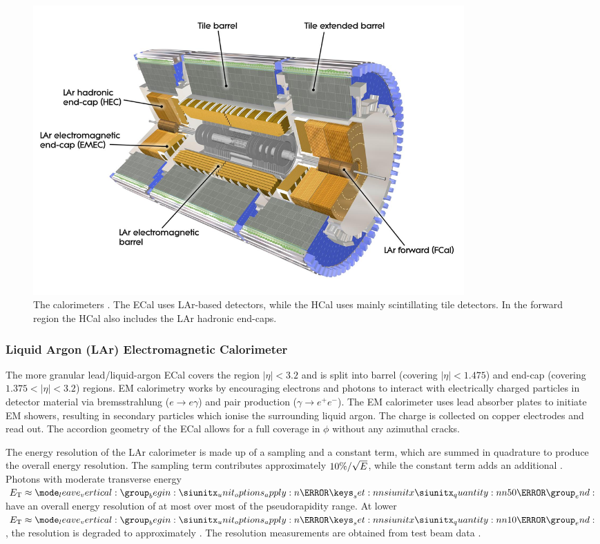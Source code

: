 %
\begin{figure}[!htpb]
  \centering
  \includegraphics[width=0.8\textwidth]{chapters/2.detector/figs/atlas_calos.jpg}
  \caption{
    The \ATLAS calorimeters \cite{atlascalo}.
    The ECal uses LAr-based detectors, while the HCal uses mainly scintillating tile detectors.
    In the forward region the HCal also includes the LAr hadronic end-caps.
  }
  \label{fig:atlas_calos}
\end{figure}
%


\subsubsection{Liquid Argon (LAr) Electromagnetic Calorimeter}
The more granular lead/liquid-argon ECal covers the region $|\eta|< 3.2$ and is split into barrel (covering $|\eta| < 1.475$) and end-cap (covering $1.375 < |\eta| < 3.2$) regions.
EM calorimetry works by encouraging electrons and photons to interact with electrically charged particles in detector material via bremsstrahlung ($e \rightarrow e\gamma$) and pair production ($\gamma \rightarrow e^+ e^- $).
The EM calorimeter uses lead absorber plates to initiate EM showers, resulting in secondary particles which ionise the surrounding liquid argon.
The charge is collected on copper electrodes and read out.
The accordion geometry of the ECal allows for a full coverage in $\phi$ without any azimuthal cracks.

The energy resolution of the LAr calorimeter is made up of a sampling and a constant term, which are summed in quadrature to produce the overall energy resolution.
The sampling term contributes approximately $10\% / \sqrt{E}$, while the constant term adds an additional .
Photons with moderate transverse energy $\ET \approx \SI{50}{\GeV}$ have an overall energy resolution of at most  over most of the pseudorapidity range.
At lower $\ET \approx \SI{10}{\GeV}$, the resolution is degraded to approximately .
The resolution measurements are obtained from test beam data \cite{ATLAS-TDR-14}.

